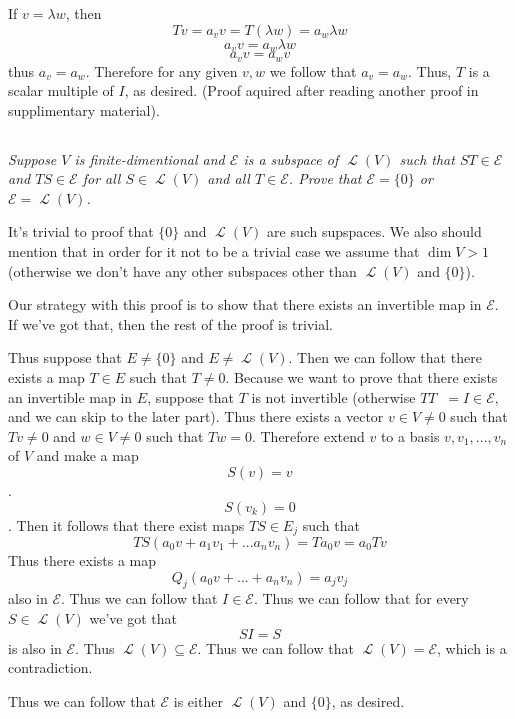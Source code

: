 \documentclass[11pt,oneside,titlepage]{book}
\DeclareMathOperator \map {\mathcal {L}}
\DeclareMathOperator \inv {^{-1}}
\begin{document}
If $v = \lambda w$,  then
$$Tv = a_v v = T(\lambda w) = a_w \lambda w$$
$$a_v v =  a_w \lambda w$$
$$a_v v =  a_w v$$
thus $a_v = a_w$. Therefore for any given $v, w$ we follow that $a_v = a_w$. Thus, $T$ is a
scalar multiple of $I$, as desired. (Proof aquired after reading another proof in supplimentary
material).

\subsection{}

\textit{Suppose $V$ is finite-dimentional and $\mathcal E$ is a subspace of $\map(V)$ such
  that $ST \in  \mathcal E$ and $TS \in \mathcal E$ for all $S \in \map(V)$ and all
  $T \in \mathcal E$. Prove that $\mathcal E  = \{0\}$ or $\mathcal E = \map(V)$.}

It's trivial to proof that $\{0\}$ and $\map(V)$ are such supspaces. We also should
mention that in order for it not to be a trivial case we assume that $\dim V > 1$ (otherwise
we don't have any other subspaces other than $\map (V)$ and $\{0\}$).

Our strategy with this proof is to show that there exists an invertible map in $\mathcal E$.
If we've got that, then the rest of the proof is trivial.

Thus suppose that
$E \neq \{0\}$ and $E \neq \map(V)$. Then we can follow that there exists a map
$T \in E$ such that $T \neq 0$. Because we want to prove that there exists an invertible map
in $E$, suppose that $T$ is not invertible (otherwise $T T \inv = I \in \mathcal E$, and we
can skip to the later part).
Thus there exists a vector $v \in V \neq 0$ such that 
$Tv \neq 0$ and $w \in V \neq 0$ such that $Tw = 0$.
Therefore extend $v$ to a basis $v, v_1, ..., v_n$ of $V$ and make a map
$$S (v) = v$$.
$$S (v_k) = 0$$.
Then it follows that there exist maps $T S \in E_j$ such that
$$TS(a_0 v + a_1 v_1 + ... a_n v_n) = Ta_0 v = a_0 T v$$
Thus there exists a map 
$$Q_j (a_0 v + ... + a_n v_n) = a_j v_j$$
also in $\mathcal E$.
Thus we can follow that $I \in \mathcal E$. Thus we can follow that for every $S \in \map(V)$
we've got that
$$SI = S$$
is also in $\mathcal E$. Thus $\map(V) \subseteq \mathcal E$. Thus  we can follow that
$\map(V) = \mathcal E$, which is a contradiction.

Thus we can follow that $\mathcal E$ is either $\map(V)$ and $\{0\}$, as desired.

\subsection{}
\end{document}
